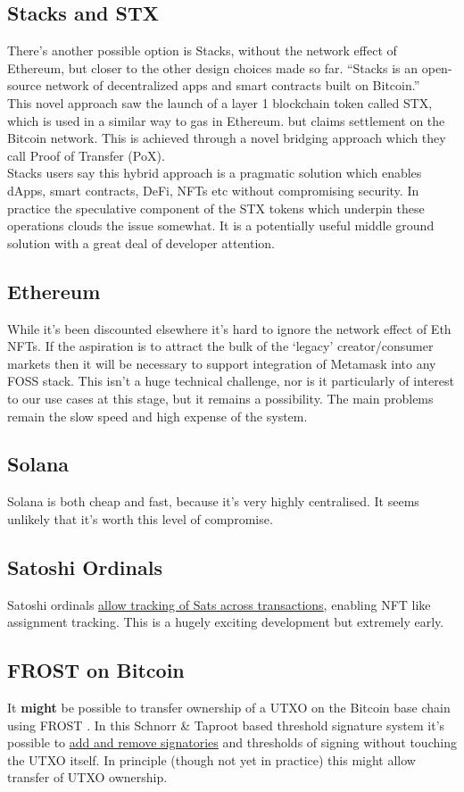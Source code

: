 \subsection{Stacks and STX}
There's another possible option is Stacks, without the network effect of Ethereum, but closer to the other design choices made so far. ``Stacks is an open-source network of decentralized apps and smart contracts built on Bitcoin.''\\ 
This novel approach saw the launch of a layer 1 blockchain token called STX, which is used in a similar way to gas in Ethereum. but claims settlement on the Bitcoin network. This is achieved through a novel bridging approach which they call Proof of Transfer (PoX).\\
Stacks users say this hybrid approach is a pragmatic solution which enables dApps, smart contracts, DeFi, NFTs etc without compromising security. In practice the speculative component of the STX tokens which underpin these operations clouds the issue somewhat. It is a potentially useful middle ground solution with a great deal of developer attention.
\subsection{Ethereum}
While it's been discounted elsewhere it's hard to ignore the network effect of Eth NFTs. If the aspiration is to attract the bulk of the `legacy' creator/consumer markets then it will be necessary to support integration of Metamask into any FOSS stack. This isn't a huge technical challenge, nor is it particularly of interest to our use cases at this stage, but it remains a possibility. The main problems remain the slow speed and high expense of the system.
\subsection{Solana}
Solana is both cheap and fast, because it's very highly centralised. It seems unlikely that it's worth this level of compromise.
\subsection{Satoshi Ordinals}
Satoshi ordinals \href{https://github.com/casey/ord}{allow tracking of Sats across transactions}, enabling NFT like assignment tracking. This is a hugely exciting development but extremely early.
\subsection{FROST on Bitcoin}
It \textbf{might} be possible to transfer ownership of a UTXO on the Bitcoin base chain using FROST \cite{komlo2020frost}. In this Schnorr \& Taproot based threshold signature system it's possible to \href{https://btctranscripts.com/sydney-bitcoin-meetup/2022-03-29-socratic-seminar/}{add and remove signatories} and thresholds of signing without touching the UTXO itself. In principle (though not yet in practice) this might allow transfer of UTXO ownership. 
